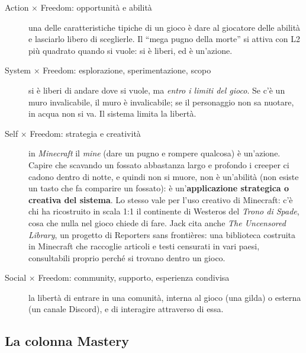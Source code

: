 \begin{description}
  \item[Action $\times$ Freedom: opportunità e abilità] una delle
        caratteristiche tipiche di un gioco è dare al giocatore delle abilità e
        lasciarlo libero di sceglierle. Il ``mega pugno della morte'' si attiva
        con L2 più quadrato quando si vuole: si è liberi, ed è un'azione.
  \item[System $\times$ Freedom: esplorazione, sperimentazione, scopo] si è
        liberi di andare dove si vuole, ma \emph{entro i limiti del gioco}. Se
        c'è un muro invalicabile, il muro è invalicabile; se il personaggio non
        sa nuotare, in acqua non si va. Il sistema limita la libertà.
  \item[Self $\times$ Freedom: strategia e creatività] in \emph{Minecraft} il
        \emph{mine} (dare un pugno e rompere qualcosa) è un'azione. Capire che
        scavando un fossato abbastanza largo e profondo i creeper ci cadono
        dentro di notte, e quindi non si muore, non è un'abilità (non esiste
        un tasto che fa comparire un fossato): è un'\textbf{applicazione
        strategica o creativa del sistema}. Lo stesso vale per l'uso creativo
        di Minecraft: c'è chi ha ricostruito in scala 1:1 il continente di
        Westeros del \emph{Trono di Spade}, cosa che nulla nel gioco chiede di
        fare. Jack cita anche \emph{The Uncensored Library}, un progetto di
        Reporters sans frontières: una biblioteca costruita in Minecraft che
        raccoglie articoli e testi censurati in vari paesi, consultabili
        proprio perché si trovano dentro un gioco.
  \item[Social $\times$ Freedom: community, supporto, esperienza condivisa]
        la libertà di entrare in una comunità, interna al gioco (una gilda) o
        esterna (un canale Discord), e di interagire attraverso di essa.
\end{description}

\subsection{La colonna Mastery}

